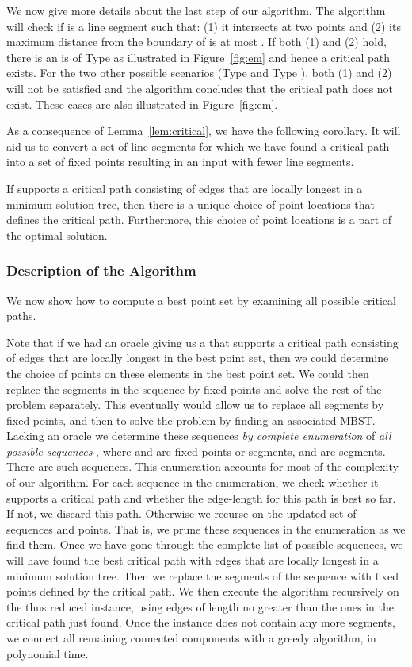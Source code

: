 We now give more details  about the last step of our algorithm. The algorithm will check if  is a line segment such that: (1) it intersects  at two points and (2) its maximum distance from the boundary of  is at most . If both (1) and (2) hold, there is an  is of Type  as illustrated in Figure~\ref{fig:em} and hence a critical path exists. For the two other possible scenarios (Type  and Type ), both (1) and (2) will not be satisfied and the algorithm concludes that the critical path does not exist. These cases are also illustrated in Figure~\ref{fig:em}.

As a consequence of  Lemma~\ref{lem:critical}, we have the following corollary. It will aid us to convert a set of line segments for which we have found a critical path into a set of fixed points resulting in an input with fewer line segments.

\begin{corollary}
  If   supports a critical path consisting of edges that are locally longest in a minimum solution tree, then there is a unique choice of point locations that defines the critical path. Furthermore, this choice of point locations is a part of the optimal solution.
\end{corollary}


\subsubsection*{Description of the Algorithm}

We now show how to compute a best point set
by examining all possible critical paths.

Note that if we had an oracle giving us a
 that supports a critical path consisting of edges that are locally longest in
the best point set, then we could determine the choice of points on these
elements in the best point set. We could then replace the segments in
the sequence by fixed points and solve the rest of the problem
separately.
This eventually would allow us to replace all segments by
fixed points, and then to solve the problem by finding an associated MBST.
Lacking an
oracle
we determine
these sequences  \emph{by complete enumeration} of \emph{all possible sequences} , where  and  are fixed points or
segments, and  are segments.  There are  such sequences.
This enumeration accounts for most of the complexity of
our algorithm.
For each sequence in the enumeration,
we check whether it supports a critical path and whether the edge-length for this path is best so far. If not, we discard this path.  Otherwise we recurse on the updated set of sequences and points.
That is, we prune these sequences in the enumeration as we find them. Once we have gone through the complete list of possible sequences, we will have found the best critical path with edges that are locally longest in a minimum solution tree.
Then we replace the segments of the sequence with fixed points defined by the critical path.
We then execute the algorithm recursively on the thus reduced instance, using edges of length no greater than the ones in the critical
path just found.
Once the instance does not contain any more segments, we connect all remaining connected components with a greedy algorithm, in polynomial time.

